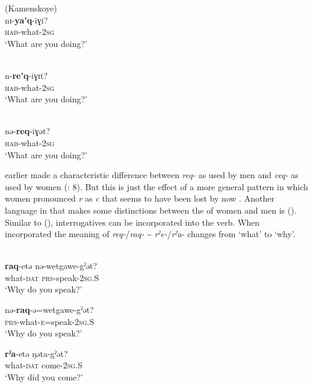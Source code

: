 \newpage     
\ea%
    \label{ex:chuk:13}
     (Kamenskoye)\\
    \gll nɪ-\textbf{{ya’q}}{-iɣi?}\\
    \textsc{hab}-what-2\textsc{sg}\\
    \glt ‘What are you doing?’ \citep[730]{Bogoras1922}
    \z

\ea%
    \label{ex:chuk:14}
    \\
    \gll n-\textbf{{re’q}}-iɣɪt?\\
    \textsc{hab}-what\textsc{-}2\textsc{sg}\\
    \glt ‘What are you doing?’ \citep[730]{Bogoras1922}
    \z

\ea%
    \label{ex:chuk:15}
    \\
    \gll nə-\textbf{{req}}-iɣət?\\
    \textsc{hab}-what-\textsc{2sg}\\
    \glt ‘What are you doing?’ \citep[368]{Dunn1999}
    \z

 earlier made a characteristic difference between \textit{req-} as used by men and \textit{ceq}\textit{-} as used by women (\citealt{KämpfeVolodin1995}: 8). But this is just the effect of a more general pattern in which women pronounced \textit{r} as \textit{c} that seems to have been lost by now \citep{Dunn2000}. Another language in  that makes some distinctions between the  of women and men is  (). Similar to  (), interrogatives can be incorporated into the verb. When incorporated the meaning of \textit{req-}/\textit{raq-} {\textasciitilde} \textit{rˀe-}/\textit{rˀa-} changes from ‘what’ to ‘why’.

\ea%
    \label{ex:chuk:16}
    \\
    \ea
    \gll \textbf{{raq}}-etə    nə-wetgawe-gˀət?\\
    what-\textsc{dat}  \textsc{prs}-speak-2\textsc{sg}.S\\
    \glt ‘Why do you speak?’

    \ex
    \gll nə-\textbf{{raq}}-ə=wetgawe-gˀət?\\
    \textsc{prs}-what-\textsc{e}=speak-2\textsc{sg}.S\\
    \glt ‘Why do you speak?’

    \ex
    \gll \textbf{{rˀa}}-etə    ŋəta-gˀət?\\
    what-\textsc{dat}  come-2\textsc{sg}.S\\
    \glt ‘Why did you come?’

